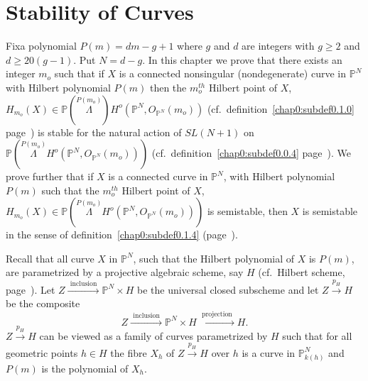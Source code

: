\chapter{Stability of Curves}\label{chap1} %

Fix\pageoriginale a polynomial $P(m) = dm-g+1$ where $g$ and $d$ are
integers with 
$g \ge 2$ and $d \ge 20 (g-1)$. Put $N = d - g$. In this chapter we
prove that there exists an integer $m_o$ such that if $X$ is a
connected nonsingular (nondegenerate) curve in $\mathbb{P}^N$ with
Hilbert polynomial $P(m)$ then the $m_o^{th}$ Hilbert point of $X$,
$H_{m_o} (X) \in \mathbb{P} (\overset{P(m_o)} \Lambda)  H^o
(\mathbb{P}^N, O_{\mathbb{P}^N} (m_o))$ (cf.\ definition~\ref{chap0:subdef0.1.0}
page~\pageref{chap0:subdef0.1.0}) is stable for the natural action of
$SL(N+1)$ on 
$\mathbb{P} (\overset{P(m_o)}{\Lambda}  H^o (\mathbb{P}^N,
O_{\mathbb{P}^N} (m_o)))$ (cf.\ definition~\ref{chap0:subdef0.0.4} 
page~\pageref{chap0:subdef0.0.4}). We  
prove further that if $X$ is a connected curve in $\mathbb{P}^N$, with
Hilbert polynomial $P(m)$ such that the $m_o^{th}$ Hilbert point of
$X$, $H_{m_o} (X) \in \mathbb{P} (\overset{P(m_o)}{\Lambda}  H^o
(\mathbb{P}^N, O_{\mathbb{P}^N} (m_o)))$ is semistable, then $X$ 
is semistable in the sense of definition~\ref{chap0:subdef0.1.4} 
(page~\pageref{chap0:subdef0.1.4}).  

Recall that all curve $X$ in $\mathbb{P}^N$, such that  the Hilbert
polynomial of $X$ is $P(m)$, are parametrized by a projective
algebraic scheme, say $H$ (cf.\ Hilbert scheme, page~\pageref{page11}). Let $Z
\xrightarrow{\text { inclusion }} \mathbb{P}^N \times H$ be the
universal closed subscheme and  let $Z \xrightarrow{p_H} H$ be the
composite  
$$
Z \xrightarrow {\text { inclusion }} \mathbb{P}^N \times H
\xrightarrow {\text { projection }} H. 
$$ 
$Z \xrightarrow{p_H} H$ can be viewed as a family of curves
parametrized by $H$ such that for all geometric points $h \in H$ the
fibre $X_h$ of $Z \xrightarrow{p_H} H $ over $h$ is a curve in
$\mathbb{P}^N _{k(h)}$ and $P(m)$ is the polynomial of $X_h$.  

\medskip
{}

